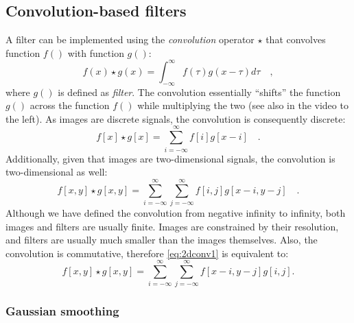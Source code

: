 \subsection{Convolution-based filters}


A filter can be implemented using the \textsl{convolution} operator $\star$ that convolves function $f()$ with function $g()$:
\begin{equation}
f(x)\star g(x)=\int_{-\infty}^{\infty}f(\tau)g(x-\tau)d\tau \quad,
\end{equation}
where $g()$ is defined as \textsl{filter}.
The convolution essentially ``shifts'' the function $g()$ across the function $f()$ while multiplying the two (see also in the video to the left). As images are discrete signals, the convolution is consequently discrete:
\begin{equation}
f[x]\star g[x]=\sum_{i=-\infty}^{\infty}f[i]g[x-i]\quad .
\end{equation}
Additionally, given that images are two-dimensional signals, the convolution is two-dimensional as well:
\begin{equation}\label{eq:2dconv1}
f[x,y]\star g[x,y]=\sum_{i=-\infty}^{\infty}\sum_{j=-\infty}^{\infty}f[i,j]g[x-i,y-j]\quad.
\end{equation}
Although we have defined the convolution from negative infinity to infinity, both images and filters are usually finite. Images are constrained by their resolution, and filters are usually much smaller than the images themselves. Also, the convolution is commutative, therefore \cref{eq:2dconv1} is equivalent to:
\begin{equation}\label{eq:2dconv2}
f[x,y]\star g[x,y]=\sum_{i=-\infty}^{\infty}\sum_{j=-\infty}^{\infty}f[x-i,y-j]g[i,j].
\end{equation}

\subsubsection{Gaussian smoothing}

